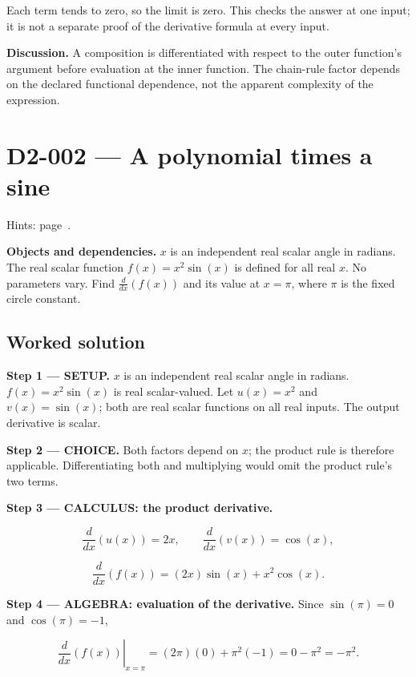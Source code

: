 \documentclass[11pt,oneside,openany]{book}
\begin{document}
Each term tends to zero, so the limit is zero. This checks the answer at one input; it is not a separate proof of the derivative formula at every input.

\textbf{Discussion.} A composition is differentiated with respect to the outer function's argument before evaluation at the inner function. The chain-rule factor depends on the declared functional dependence, not the apparent complexity of the expression.
\clearpage
\section{D2-002 --- A polynomial times a sine}
\label{problem:D2-002}
{\small Hints: page~\pageref{hints:D2-002}.}\par\medskip

\textbf{Objects and dependencies.} \(x\) is an independent real scalar angle in radians.
The real scalar function \(f(x)=x^2\sin(x)\) is defined for all real \(x\). No parameters
vary. Find \(\frac{d}{dx}\left(f(x)\right)\) and its value at \(x=\pi\), where \(\pi\) is
the fixed circle constant.
\subsection*{Worked solution}

\textbf{Step 1 --- SETUP.} \(x\) is an independent real scalar angle in radians.
\(f(x)=x^2\sin(x)\) is real scalar-valued. Let \(u(x)=x^2\) and \(v(x)=\sin(x)\);
both are real scalar functions on all real inputs. The output derivative is scalar.

\begin{ChoiceStep}
\textbf{Step 2 --- CHOICE.} Both factors depend on \(x\); the product rule is therefore applicable. Differentiating
both and multiplying would omit the product rule's two terms.

\end{ChoiceStep}
\textbf{Step 3 --- CALCULUS: the product derivative.}

\[
\frac{d}{dx}\left(u(x)\right)=2x,\qquad
\frac{d}{dx}\left(v(x)\right)=\cos(x),
\]

\[
\frac{d}{dx}\left(f(x)\right)
=(2x)\sin(x)+x^2\cos(x).
\]

\begingroup\color{AlgebraBlue}
\textbf{Step 4 --- ALGEBRA: evaluation of the derivative.} Since \(\sin(\pi)=0\) and
\(\cos(\pi)=-1\),

\[
\left.\frac{d}{dx}\left(f(x)\right)\right|_{x=\pi}
=(2\pi)(0)+\pi^2(-1)=0-\pi^2=-\pi^2.
\]
\end{document}
